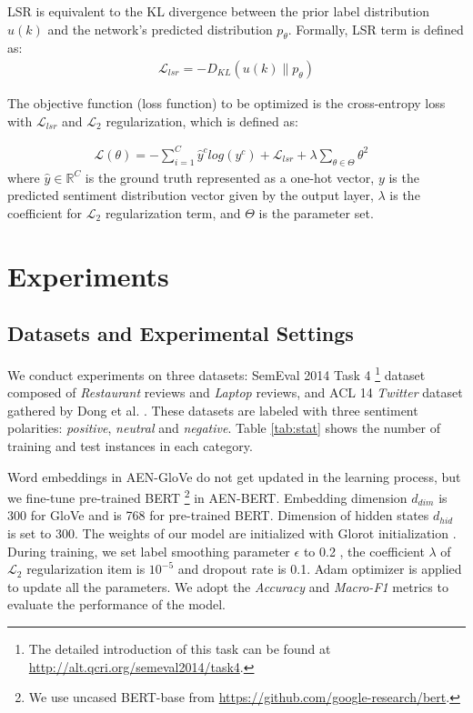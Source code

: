 \documentclass[11pt,a4paper]{article}
\begin{document}
LSR is equivalent to the KL divergence between the prior label distribution $u(k)$ and the network's predicted distribution $p_\theta$.
Formally, LSR term is defined as:
\begin{align}
\mathcal{L}_{lsr} = - D_{KL}(u(k) \| p_\theta)
\end{align}

The objective function (loss function) to be optimized is the cross-entropy loss with $\mathcal{L}_{lsr}$ and $\mathcal{L}_2$ regularization, which is defined as:

\begin{align}
\mathcal{L}(\theta) = - \sum_{i=1}^{C} \hat{y}^c log (y^c) + \mathcal{L}_{lsr} + \lambda \sum_{\theta \in \Theta} {\theta}^2 &
\end{align}
where $\hat{y} \in \mathbb{R}^C $ is the ground truth represented as a one-hot vector,
$y$ is the predicted sentiment distribution vector given by the output layer,
$\lambda$ is the coefficient for $\mathcal{L}_2$ regularization term, and $\Theta$ is the parameter set.




\section{Experiments}

\subsection{Datasets and Experimental Settings}

We conduct experiments on three datasets: SemEval 2014 Task 4 \footnote{The detailed introduction of this task can be found at \url{http://alt.qcri.org/semeval2014/task4}.} \cite{pontiki2014semeval} dataset composed of \emph{Restaurant} reviews and \emph{Laptop} reviews, and ACL 14 \emph{Twitter} dataset gathered by Dong et al. . These datasets are labeled with three sentiment polarities: \emph{positive}, \emph{neutral} and \emph{negative}.
Table \ref{tab:stat} shows the number of training and test instances in each category.

Word embeddings in AEN-GloVe do not get updated in the learning process,
but we fine-tune pre-trained BERT
\footnote{We use uncased BERT-base from \url{https://github.com/google-research/bert}.} in AEN-BERT.
Embedding dimension $d_{dim}$ is 300 for GloVe and is 768 for pre-trained BERT.
Dimension of hidden states $d_{hid}$ is set to 300.
The weights of our model are initialized with Glorot initialization \cite{glorot2010understanding}.
During training, we set label smoothing parameter $\epsilon$ to 0.2 \cite{szegedy2016rethinking}, the coefficient $\lambda$ of $\mathcal{L}_2$ regularization item is $10^{-5}$ and dropout rate is 0.1.
Adam optimizer \cite{kingma2014adam} is applied to update all the parameters.
We adopt the \emph{Accuracy} and \emph{Macro-F1} metrics to evaluate the performance of the model.
\end{document}
